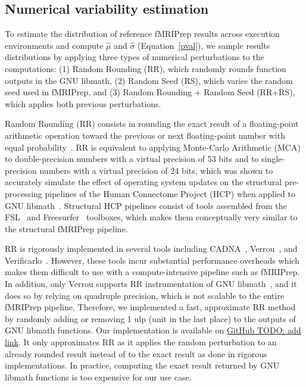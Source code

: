 \documentclass{article}
\newcommand{\TODO}[1]{\color{red}\textsc{TODO:} #1\color{black}\xspace}
\begin{document}
\subsection{Numerical variability estimation}

To estimate the distribution of reference fMRIPrep results across execution environments and compute $\hat \mu$ and $\hat \sigma$ (Equation~\ref{pval}), we sample results distributions by applying three types of numerical perturbations to the computations: (1) Random Rounding (RR), which randomly rounds function outputs in the GNU libmath, (2) Random Seed (RS), which varies the random seed used in fMRIPrep, and (3) Random Rounding + Random Seed (RR+RS), which applies both previous perturbations.

Random Rounding (RR) consists in rounding the exact result of a floating-point arithmetic
operation toward the previous or next floating-point number with equal
probability~\cite{forsythe1959reprint}. RR is equivalent to applying Monte-Carlo Arithmetic (MCA) to double-precision numbers with a virtual precision of 53 bits and to single-precision numbers with a virtual precision of 24 bits, which was shown to accurately simulate the effect of operating system updates on the structural pre-processing pipelines of the Human Connectome Project (HCP) when applied to GNU libmath~\cite{salari2021accurate}. Structural HCP pipelines consist of tools assembled from the FSL~\cite{jenkinson2012fsl} and Freesurfer~\cite{fischl2012freesurfer} toolboxes, which makes them conceptually very similar to the structural fMRIPrep pipeline.

RR is rigorously implemented in several tools 
including CADNA~\cite{jezequel2008cadna}, Verrou~\cite{fevotte2016verrou}, and 
Verificarlo~\cite{denis2016verificarlo}. However, these tools incur substantial 
performance overheads which makes them difficult to use with a compute-intensive pipeline 
such as fMRIPrep. In addition, only Verrou supports RR instrumentation of GNU 
libmath~\cite{papierverroulibmath}, and it does so by relying on quadruple precision, 
which is not scalable to the entire fMRIPrep pipeline. Therefore, we implemented a fast, 
approximate RR method by randomly adding or removing 1 ulp (unit in the last place) to 
the outputs of GNU libmath functions. Our implementation is available on \href{...}{GitHub
\TODO{add link}}. It only approximates RR as it applies the random 
perturbation to an already rounded result instead of to the exact result as done in 
rigorous implementations. In practice, computing the exact result returned by GNU libmath 
functions is too expensive for our use case. 
\end{document}
